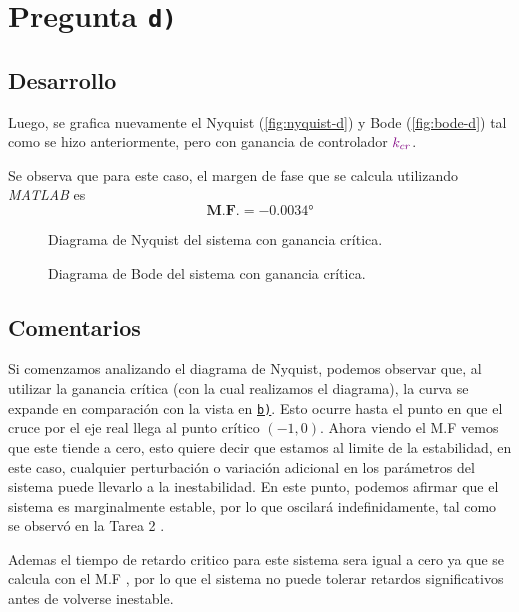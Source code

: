 \section{Pregunta \texttt{d)}}\label{pregunta-d}

\subsection{Desarrollo}

Luego, se grafica nuevamente el Nyquist (\autoref{fig:nyquist-d}) y Bode (\autoref{fig:bode-d})
tal como se hizo anteriormente, pero con ganancia de controlador $\mathbin{\color{violet}k_{cr}}$.

Se observa que para este caso, el margen de fase que se calcula utilizando
\textit{MATLAB} es
\begin{equation}
  \boxed{\textbf{M.F.} = \ang{-0.0034}}
\end{equation}

\begin{figure}[h]
  \centering
  
  \caption{Diagrama de Nyquist del sistema con ganancia crítica.}
  \label{fig:nyquist-d}
\end{figure}

\begin{figure}[h]
  \centering
  
  \caption{Diagrama de Bode del sistema con ganancia crítica.}
  \label{fig:bode-d}
\end{figure}


\FloatBarrier
\subsection{Comentarios}

Si comenzamos analizando el diagrama de Nyquist, podemos observar que, al utilizar la ganancia crítica (con la cual realizamos el diagrama), la curva se expande en comparación con la vista en \hyperref[pregunta-b]{\texttt{b)}}. Esto ocurre hasta el punto en que el cruce por el eje real llega al punto crítico 
\((-1, 0)\).
Ahora viendo el M.F vemos que este tiende a cero, esto quiere decir que estamos al limite de la estabilidad, en este caso, cualquier perturbación o variación adicional en los parámetros del sistema puede llevarlo a la inestabilidad. En este punto, podemos afirmar que el sistema es marginalmente estable, por lo que oscilará indefinidamente, tal como se observó en la Tarea 2 \cite{tarea-2-sdc}.

Ademas el tiempo de retardo critico para este sistema sera igual a cero ya que se calcula con el M.F , por lo que el sistema no puede tolerar retardos significativos antes de volverse inestable.
